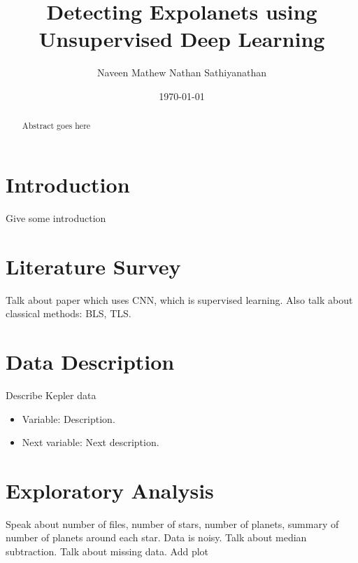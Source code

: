 \documentclass[%
aip,
amsmath,amssymb,
reprint,%
]{revtex4-1}
\begin{document}
\title{Detecting Expolanets using Unsupervised Deep Learning}

\author{Naveen Mathew Nathan Sathiyanathan}

\date{\today}

\begin{abstract}
Abstract goes here
\end{abstract}

\maketitle

\section{Introduction}

Give some introduction

\section{Literature Survey}

Talk about paper which uses CNN, which is supervised learning. Also talk about classical methods: BLS, TLS.

\section{Data Description}

Describe Kepler data

\begin{itemize}
	\item Variable: Description.
	\item Next variable: Next description.
\end{itemize}

\section{Exploratory Analysis}

Speak about number of files, number of stars, number of planets, summary of number of planets around each star. Data is noisy. Talk about median subtraction. Talk about missing data. Add plot
\end{document}
